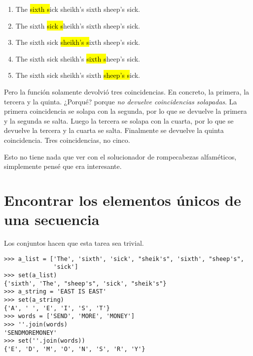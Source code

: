 \begin{enumerate}

\item The\hl{ sixth s}ick sheikh's sixth sheep's sick.
\item The sixth\hl{ sick s}heikh's sixth sheep's sick.
\item The sixth sick\hl{ sheikh's s}ixth sheep's sick.
\item The sixth sick sheikh's\hl{ sixth s}heep's sick.
\item The sixth sick sheikh's sixth\hl{ sheep's s}ick.

\end{enumerate}

Pero la función  solamente devolvió tres coincidencias. En concreto, la primera, la tercera y la quinta. ¿Porqué? porque \emph{no devuelve coincidencias solapadas}. La primera coincidencia se solapa con la segunda, por lo que se devuelve la primera y la segunda se salta. Luego la tercera se solapa con la cuarta, por lo que se devuelve la tercera y la cuarta se salta. Finalmente se devuelve la quinta coincidencia. Tres coincidencias, no cinco.

Esto no tiene nada que ver con el solucionador de rompecabezas alfaméticos, simplemente pensé que era interesante.

\section{Encontrar los elementos únicos de una secuencia}

Los conjuntos hacen que esta tarea sea trivial.

\noindent\begin{minipage}{\textwidth}
\begin{lstlisting}[mathescape=True]
>>> a_list = ['The', 'sixth', 'sick', "sheik's", 'sixth', "sheep's",
              'sick']
>>> set(a_list)
{'sixth', 'The', "sheep's", 'sick', "sheik's"}
>>> a_string = 'EAST IS EAST'
>>> set(a_string)
{'A', ' ', 'E', 'I', 'S', 'T'}
>>> words = ['SEND', 'MORE', 'MONEY']
>>> ''.join(words)
'SENDMOREMONEY'
>>> set(''.join(words))
{'E', 'D', 'M', 'O', 'N', 'S', 'R', 'Y'}
\end{lstlisting}
\end{minipage}

